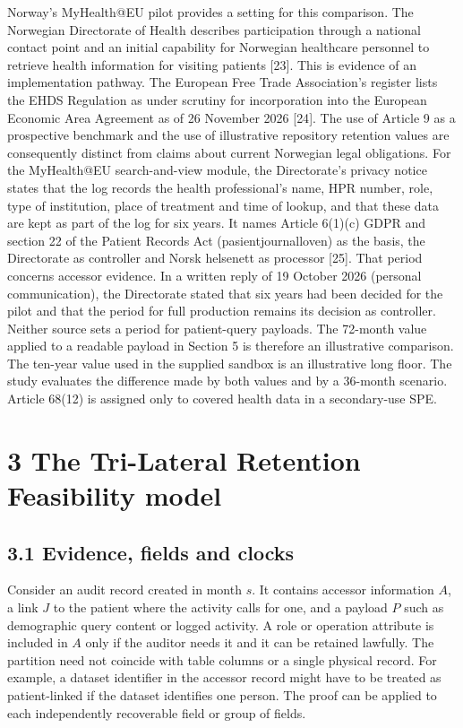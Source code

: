 \documentclass[preprint,review,12pt]{elsarticle}
\begin{document}
Norway's MyHealth@EU pilot provides a setting for this comparison. The
Norwegian Directorate of Health describes participation through a
national contact point and an initial capability for Norwegian
healthcare personnel to retrieve health information for visiting
patients {[}23{]}. This is evidence of an implementation pathway. The
European Free Trade Association's register lists the EHDS Regulation as
under scrutiny for incorporation into the European Economic Area
Agreement as of 26 November 2026 {[}24{]}. The use of Article 9 as a
prospective benchmark and the use of illustrative repository retention
values are consequently distinct from claims about current Norwegian
legal obligations. For the MyHealth@EU search-and-view module, the
Directorate's privacy notice states that the log records the health
professional's name, HPR number, role, type of institution, place of
treatment and time of lookup, and that these data are kept as part of
the log for six years. It names Article 6(1)(c) GDPR and section 22 of
the Patient Records Act (pasientjournalloven) as the basis, the
Directorate as controller and Norsk helsenett as processor {[}25{]}.
That period concerns accessor evidence. In a written reply of 19 October
2026 (personal communication), the Directorate stated that six years had
been decided for the pilot and that the period for full production
remains its decision as controller. Neither source sets a period for
patient-query payloads. The 72-month value applied to a readable payload
in Section 5 is therefore an illustrative comparison. The ten-year value
used in the supplied sandbox is an illustrative long floor. The study
evaluates the difference made by both values and by a 36-month scenario.
Article 68(12) is assigned only to covered health data in a
secondary-use SPE.

\hypertarget{the-tri-lateral-retention-feasibility-model}{%
\section{3 The Tri-Lateral Retention Feasibility
model}\label{the-tri-lateral-retention-feasibility-model}}

\hypertarget{evidence-fields-and-clocks}{%
\subsection{3.1 Evidence, fields and
clocks}\label{evidence-fields-and-clocks}}

Consider an audit record created in month \(s\). It contains accessor
information \(A\), a link \(J\) to the patient where the activity calls
for one, and a payload \(P\) such as demographic query content or logged
activity. A role or operation attribute is included in \(A\) only if the
auditor needs it and it can be retained lawfully. The partition need not
coincide with table columns or a single physical record. For example, a
dataset identifier in the accessor record might have to be treated as
patient-linked if the dataset identifies one person. The proof can be
applied to each independently recoverable field or group of fields.
\end{document}
